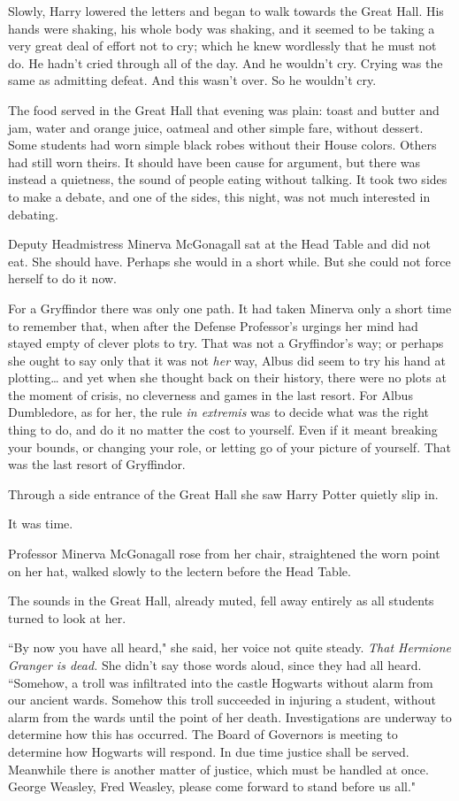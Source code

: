 Slowly, Harry lowered the letters and began to walk towards the Great Hall. His hands were shaking, his whole body was shaking, and it seemed to be taking a very great deal of effort not to cry; which he knew wordlessly that he must not do. He hadn't cried through all of the day. And he wouldn't cry. Crying was the same as admitting defeat. And this wasn't over. So he wouldn't cry.

\later

The food served in the Great Hall that evening was plain: toast and butter and jam, water and orange juice, oatmeal and other simple fare, without dessert. Some students had worn simple black robes without their House colors. Others had still worn theirs. It should have been cause for argument, but there was instead a quietness, the sound of people eating without talking. It took two sides to make a debate, and one of the sides, this night, was not much interested in debating.

Deputy Headmistress Minerva McGonagall sat at the Head Table and did not eat. She should have. Perhaps she would in a short while. But she could not force herself to do it now.

For a Gryffindor there was only one path. It had taken Minerva only a short time to remember that, when after the Defense Professor's urgings her mind had stayed empty of clever plots to try. That was not a Gryffindor's way; or perhaps she ought to say only that it was not \emph{her} way, Albus did seem to try his hand at plotting{\ldots} and yet when she thought back on their history, there were no plots at the moment of crisis, no cleverness and games in the last resort. For Albus Dumbledore, as for her, the rule \emph{in extremis} was to decide what was the right thing to do, and do it no matter the cost to yourself. Even if it meant breaking your bounds, or changing your role, or letting go of your picture of yourself. That was the last resort of Gryffindor.

Through a side entrance of the Great Hall she saw Harry Potter quietly slip in.

It was time.

Professor Minerva McGonagall rose from her chair, straightened the worn point on her hat, walked slowly to the lectern before the Head Table.

The sounds in the Great Hall, already muted, fell away entirely as all students turned to look at her.

``By now you have all heard," she said, her voice not quite steady. \emph{That Hermione Granger is dead.} She didn't say those words aloud, since they had all heard. ``Somehow, a troll was infiltrated into the castle Hogwarts without alarm from our ancient wards. Somehow this troll succeeded in injuring a student, without alarm from the wards until the point of her death. Investigations are underway to determine how this has occurred. The Board of Governors is meeting to determine how Hogwarts will respond. In due time justice shall be served. Meanwhile there is another matter of justice, which must be handled at once. George Weasley, Fred Weasley, please come forward to stand before us all."

